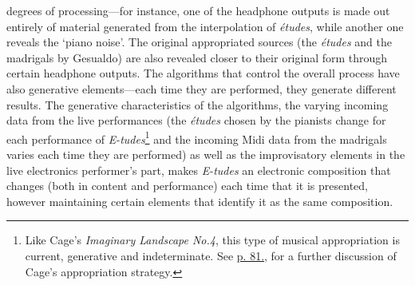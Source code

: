 degrees of processing---for instance, one of the headphone outputs is made out entirely of material generated from the interpolation of \emph{\'{e}tudes}, while another one reveals the `piano noise'. The original appropriated sources (the \emph{\'{e}tudes} and the madrigals by Gesualdo) are also revealed closer to their original form through certain headphone outputs. The algorithms that control the overall process have also generative elements---each time they are performed, they generate different results. The generative characteristics of the algorithms, the varying incoming data from the live performances (the \emph{\'{e}tudes} chosen by the pianists change for each performance of \emph{E-tudes}\footnote{Like Cage's \emph{Imaginary Landscape No.4}, this type of musical appropriation is current, generative and indeterminate. See \hyperlink{landscape4}{p. 81.}, for a further discussion of Cage's appropriation strategy.} and the incoming Midi data from the madrigals varies each time they are performed) as well as the improvisatory elements in the live electronics performer's part, makes \emph{E-tudes} an electronic composition that changes (both in content and performance) each time that it is presented, however maintaining certain elements that identify it as the same composition.

